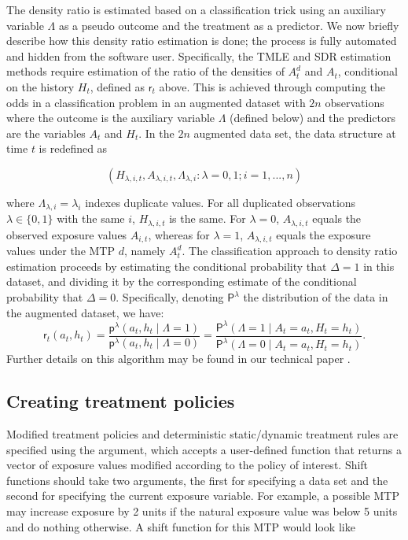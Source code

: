 \documentclass[]{jss}
\renewcommand{\r}{\mathsf{r}}
\renewcommand{\P}{\mathsf{P}}
\newcommand{\p}{\mathsf{p}}
\begin{document}
The density ratio is estimated based on a classification trick using
an auxiliary variable \(\Lambda\) as a pseudo outcome and the
treatment as a predictor. We now briefly describe how this density
ratio estimation is done; the process is fully automated and hidden
from the software user. Specifically, the TMLE and SDR estimation
methods require estimation of the ratio of the densities of $A_t^d$
and $A_t$, conditional on the history $H_t$, defined as $\r_t$
above. This is achieved through computing the odds in a classification
problem in an augmented dataset with $2n$ observations where the
outcome is the auxiliary variable $\Lambda$ (defined below) and the
predictors are the variables $A_t$ and $H_t$. In the $2n$ augmented
data set, the data structure at time \(t\) is redefined as

\begin{equation}
(H_{\lambda, i, t}, A_{\lambda, i, t}, \Lambda_{\lambda, i} : \lambda = 0, 1; i = 1, ..., n)
\end{equation}

where \(\Lambda_{\lambda, i} = \lambda_i\) indexes duplicate values.
For all duplicated observations $\lambda\in\{0,1\}$ with the same $i$,
\(H_{\lambda, i, t}\) is the same. For $\lambda = 0$,
$A_{\lambda, i, t}$ equals the observed exposure values $A_{i, t}$,
whereas for $\lambda=1$, $A_{\lambda, i, t}$ equals the exposure
values under the MTP \(d\), namely \(A^{d}_t\). The classification
approach to density ratio estimation proceeds by estimating the
conditional probability that $\Delta=1$ in this dataset, and dividing
it by the corresponding estimate of the conditional probability that
$\Delta=0$. Specifically, denoting $\P^\lambda$ the distribution of
the data in the augmented dataset, we have:
\[\r_t(a_t, h_t) = \frac{\p^\lambda(a_t, h_t \mid \Lambda =
    1)}{\p^\lambda(a_t, h_t \mid \Lambda =
    0)}=\frac{\P^\lambda(\Lambda = 1\mid A_t=a_t,
    H_t=h_t)}{\P^\lambda(\Lambda = 0\mid A_t=a_t, H_t=h_t)}.\] Further
details on this algorithm may be found in our technical paper
\citep{diazNonparametricCausalEffects2020a}.

\hypertarget{creating-treatment-policies}{%
\subsection{Creating treatment policies}\label{creating-treatment-policies}}

Modified treatment policies and deterministic static/dynamic treatment rules are specified using the  argument, which
accepts a user-defined function that returns a vector of exposure values
modified according to the policy of interest. Shift functions should take two
arguments, the first for specifying a data set and the second for
specifying the current exposure variable. For example, a possible MTP
may increase exposure by 2 units if the natural exposure value was below
5 units and do nothing otherwise. A shift function for this MTP would
look like
\end{document}

